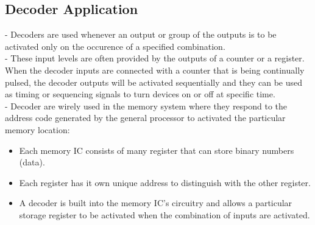 \documentclass[12pt]{article}
\begin{document}
\subsection{Decoder Application}
- Decoders are used whenever an output or group of the outputs is to be activated only on the occurence of a specified combination. \\
- These input levels are often provided by the outputs of a counter or a register. When the decoder inputs are connected with a counter that is being continually pulsed, the decoder outputs will be activated sequentially and they can be used as timing or sequencing signals to turn devices on or off at specific time. \\
- Decoder are wirely used in the memory system where they respond to the address code generated by the general processor to activated the particular memory location: \\
\begin{itemize}
	\item Each memory IC consists of many register that can store binary numbers (data).
	\item Each register has it own unique address to distinguish with the other register.
	\item A decoder is built into the memory IC's circuitry and allows a particular storage register to be activated when the combination of inputs are activated.
\end{itemize}
\end{document}

